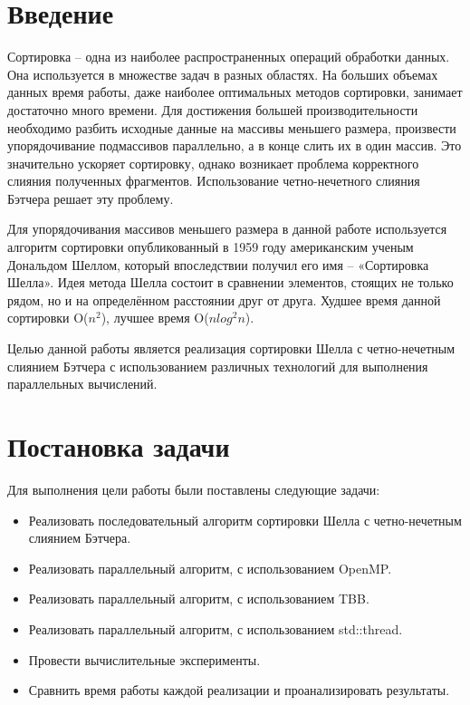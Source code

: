 \documentclass{report}
\begin{document}
\setcounter{page}{2}

\tableofcontents
\newpage

\section*{Введение}
Сортировка – одна из наиболее распространенных операций обработки данных. Она используется в множестве задач в разных областях. На больших объемах данных время работы, даже наиболее оптимальных методов сортировки, занимает достаточно много времени. Для достижения большей производительности необходимо разбить исходные данные на массивы меньшего размера, произвести упорядочивание подмассивов параллельно, а в конце слить их в один массив. Это значительно ускоряет сортировку, однако возникает проблема корректного слияния полученных фрагментов. Использование четно-нечетного слияния Бэтчера решает эту проблему.
\par Для упорядочивания массивов меньшего размера в данной работе используется алгоритм сортировки опубликованный в 1959 году американским ученым Дональдом Шеллом, который впоследствии получил его имя – «Сортировка Шелла». Идея метода Шелла состоит в сравнении элементов, стоящих не только рядом, но и на определённом расстоянии друг от друга. Худшее время данной сортировки O($n^2$), лучшее время O($nlog^2n$).
\par Целью данной работы является реализация сортировки Шелла с четно-нечетным слиянием Бэтчера с использованием различных технологий для выполнения параллельных вычислений.
\newpage

\section*{Постановка задачи}
Для выполнения цели работы были поставлены следующие задачи:
\begin{itemize}
\item Реализовать последовательный алгоритм сортировки Шелла с четно-нечетным слиянием Бэтчера.
\item Реализовать параллельный алгоритм, с использованием OpenMP.
\item Реализовать параллельный алгоритм, с использованием TBB.
\item Реализовать параллельный алгоритм, с использованием std::thread.
\item Провести вычислительные эксперименты.
\item Сравнить время работы каждой реализации и проанализировать результаты.
\end{itemize}
\end{document}
